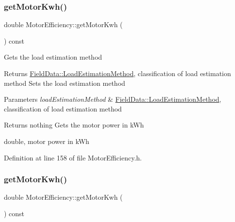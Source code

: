 \subsubsection{\texorpdfstring{get\+Motor\+Kwh()}{getMotorKwh()}\hspace{0.1cm}{\footnotesize\ttfamily [2/3]}}
{\footnotesize\ttfamily double Motor\+Efficiency\+::get\+Motor\+Kwh (\begin{DoxyParamCaption}{ }\end{DoxyParamCaption}) const\hspace{0.3cm}{\ttfamily [inline]}}

Gets the load estimation method

\begin{DoxyReturn}{Returns}
\hyperlink{class_field_data_a424e89914ba5684c01bb269dbe3312fd}{Field\+Data\+::\+Load\+Estimation\+Method}, classification of load estimation method Sets the load estimation method
\end{DoxyReturn}

\begin{DoxyParams}{Parameters}
{\em load\+Estimation\+Method} & \hyperlink{class_field_data_a424e89914ba5684c01bb269dbe3312fd}{Field\+Data\+::\+Load\+Estimation\+Method}, classification of load estimation method\\
\hline
\end{DoxyParams}
\begin{DoxyReturn}{Returns}
nothing Gets the motor power in k\+Wh

double, motor power in k\+Wh 
\end{DoxyReturn}


Definition at line 158 of file Motor\+Efficiency.\+h.

\mbox{\label{class_motor_efficiency_a4d21d0c44ee00f5d097b0acbcb73a8d8}} 
\subsubsection{\texorpdfstring{get\+Motor\+Kwh()}{getMotorKwh()}\hspace{0.1cm}{\footnotesize\ttfamily [3/3]}}
{\footnotesize\ttfamily double Motor\+Efficiency\+::get\+Motor\+Kwh (\begin{DoxyParamCaption}{ }\end{DoxyParamCaption}) const\hspace{0.3cm}{\ttfamily [inline]}}

